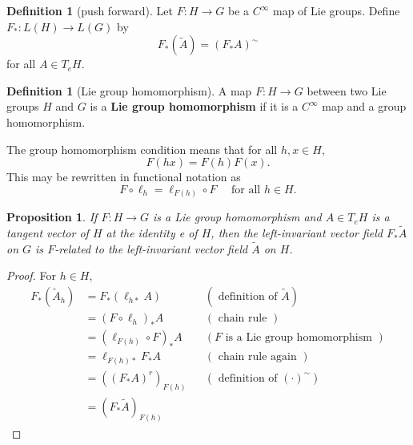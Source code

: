 \documentclass{amsart}
\theoremstyle{plain}
\newtheorem{proposition}[theorem]{Proposition}
\theoremstyle{definition}
\newtheorem{definition}[theorem]{Definition}
\theoremstyle{remark}
\begin{document}
\begin{definition}[push forward]
Let $F: H \rightarrow G$ be a $C^{\infty}$ map of Lie groups. Define $F_*: L(H) \rightarrow L(G)$ by
\[
F_*(\tilde{A})=(F_* A)^{\sim}
\]for all $A \in T_e H$.
\end{definition}
\begin{definition}[Lie group homomorphism]
A map $F: H \rightarrow G$ between two Lie groups $H$ and $G$ is a \textbf{Lie group homomorphism} if it is a $C^{\infty}$ map and a group homomorphism.
\end{definition}
The group homomorphism condition means that for all $h, x \in H$,
\[
F(h x)=F(h) F(x) .
\]
This may be rewritten in functional notation as
\[
F \circ \ell_h=\ell_{F(h)} \circ F \quad \text { for all } h \in H .
\]
\begin{proposition}
If $F: H \rightarrow G$ is a Lie group homomorphism and $A \in T_e H$ is a tangent vector of $H$ at the identity e of $H$, then the left-invariant vector field $F_* \tilde{A}$ on $G$ is $F$-related to the left-invariant vector field $\tilde{A}$ on $H$.
\end{proposition}
\begin{proof}
For $h \in H$,
\[
\begin{aligned}
F_*\left(\tilde{A}_h\right) & =F_*\left(\ell_{h *} A\right) & & (\text { definition of } \tilde{A}) \\
& =\left(F \circ \ell_h\right)_* A & & (\text { chain rule }) \\
& =\left(\ell_{F(h)} \circ F\right)_* A & & (F \text { is a Lie group homomorphism }) \\
& =\ell_{F(h) *} F_* A & & (\text { chain rule again }) \\
& =\left(\left(F_* A\right)^r\right)_{F(h)} & & (\text { definition of }(\cdot)^\sim ) \\
& =\left(F_* \tilde{A}\right)_{F(h)} & &
\end{aligned}
\]
\end{proof}
\end{document}
